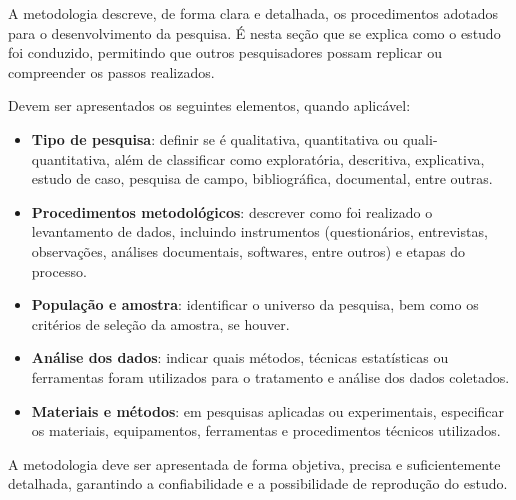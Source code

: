 A metodologia descreve, de forma clara e detalhada, os procedimentos adotados para o desenvolvimento da pesquisa. É nesta seção que se explica como o estudo foi conduzido, permitindo que outros pesquisadores possam replicar ou compreender os passos realizados.

Devem ser apresentados os seguintes elementos, quando aplicável:

\begin{itemize}
    \item \textbf{Tipo de pesquisa}: definir se é qualitativa, quantitativa ou quali-quantitativa, além de classificar como exploratória, descritiva, explicativa, estudo de caso, pesquisa de campo, bibliográfica, documental, entre outras.
    
    \item \textbf{Procedimentos metodológicos}: descrever como foi realizado o levantamento de dados, incluindo instrumentos (questionários, entrevistas, observações, análises documentais, softwares, entre outros) e etapas do processo.
    
    \item \textbf{População e amostra}: identificar o universo da pesquisa, bem como os critérios de seleção da amostra, se houver.
    
    \item \textbf{Análise dos dados}: indicar quais métodos, técnicas estatísticas ou ferramentas foram utilizados para o tratamento e análise dos dados coletados.
    
    \item \textbf{Materiais e métodos}: em pesquisas aplicadas ou experimentais, especificar os materiais, equipamentos, ferramentas e procedimentos técnicos utilizados.
\end{itemize}

A metodologia deve ser apresentada de forma objetiva, precisa e suficientemente detalhada, garantindo a confiabilidade e a possibilidade de reprodução do estudo.
